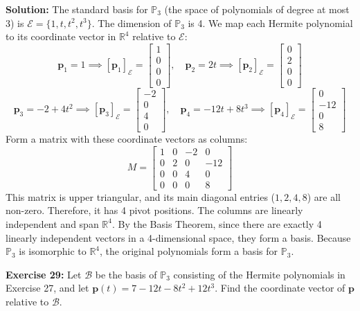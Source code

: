 \documentclass[12pt]{article}
\begin{document}
\textbf{Solution:}
The standard basis for $\mathbb{P}_3$ (the space of polynomials of degree at most 3) is $\mathcal{E} = \{1, t, t^2, t^3\}$. The dimension of $\mathbb{P}_3$ is 4.
We map each Hermite polynomial to its coordinate vector in $\mathbb{R}^4$ relative to $\mathcal{E}$:
\[ \mathbf{p}_1 = 1 \implies [\mathbf{p}_1]_{\mathcal{E}} = \begin{bmatrix} 1 \\ 0 \\ 0 \\ 0 \end{bmatrix}, \quad \mathbf{p}_2 = 2t \implies [\mathbf{p}_2]_{\mathcal{E}} = \begin{bmatrix} 0 \\ 2 \\ 0 \\ 0 \end{bmatrix} \]
\[ \mathbf{p}_3 = -2+4t^2 \implies [\mathbf{p}_3]_{\mathcal{E}} = \begin{bmatrix} -2 \\ 0 \\ 4 \\ 0 \end{bmatrix}, \quad \mathbf{p}_4 = -12t+8t^3 \implies [\mathbf{p}_4]_{\mathcal{E}} = \begin{bmatrix} 0 \\ -12 \\ 0 \\ 8 \end{bmatrix} \]
Form a matrix with these coordinate vectors as columns:
\[ M = \begin{bmatrix} 1 & 0 & -2 & 0 \\ 0 & 2 & 0 & -12 \\ 0 & 0 & 4 & 0 \\ 0 & 0 & 0 & 8 \end{bmatrix} \]
This matrix is upper triangular, and its main diagonal entries ($1, 2, 4, 8$) are all non-zero. Therefore, it has 4 pivot positions. The columns are linearly independent and span $\mathbb{R}^4$. By the Basis Theorem, since there are exactly 4 linearly independent vectors in a 4-dimensional space, they form a basis. Because $\mathbb{P}_3$ is isomorphic to $\mathbb{R}^4$, the original polynomials form a basis for $\mathbb{P}_3$.

\vspace{0.5cm}
\textbf{Exercise 29:} Let $\mathcal{B}$ be the basis of $\mathbb{P}_3$ consisting of the Hermite polynomials in Exercise 27, and let $\mathbf{p}(t) = 7 - 12t - 8t^2 + 12t^3$. Find the coordinate vector of $\mathbf{p}$ relative to $\mathcal{B}$.
\end{document}
